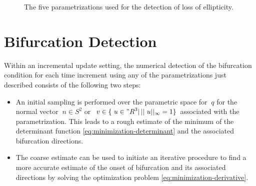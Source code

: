 \documentclass[12pt]{article}
\numberwithin{equation}{section}
\begin{document}
\begin{figure}[!htbp]
\begin{center}
{      \label{fig:projective}
    }
    \caption{The five parametrizations used for the detection of loss
      of ellipticity.}
    \label{fig:parametrizations}
  \end{center}
\end{figure}

\section{Bifurcation Detection}
\label{sec:detection}

Within an incremental update setting, the numerical detection of the
bifurcation condition for each time increment using any of the
parametrizations just described consists of the following two steps:

\begin{itemize}

\item An initial sampling is performed over the parametric space for
  $~q$ for the normal vector $~n \in S^2$ or $~v \in \{ ~u \in {"R}^3
  | \, ||~u||_\infty = 1\}$ associated with the parametrization. This
  leads to a rough estimate of the minimum of the determinant function
  \eqref{eq:minimization-determinant} and the associated bifurcation
  directions.

\item The coarse estimate can be used to initiate an iterative
  procedure to find a more accurate estimate of the onset of
  bifurcation and its associated directions by solving the
  optimization problem \eqref{eq:minimization-derivative}.

\end{itemize}
\end{document}
